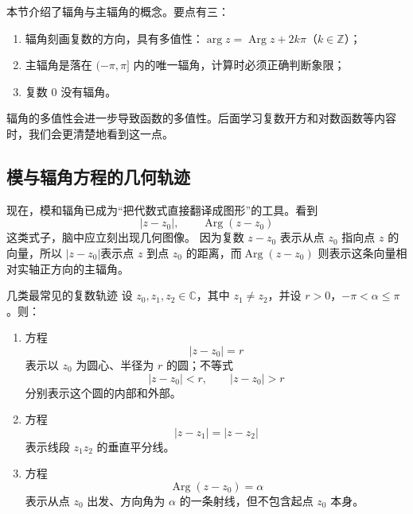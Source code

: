 \begin{zhu}{}{}
本节介绍了辐角与主辐角的概念。要点有三：
\begin{enumerate}
    \item 辐角刻画复数的方向，具有多值性：$\arg z = \operatorname{Arg}z + 2k\pi$（$k\in\mathbb{Z}$）；
    \item 主辐角是落在 $(-\pi,\pi]$ 内的唯一辐角，计算时必须正确判断象限；
    \item 复数 $0$ 没有辐角。
\end{enumerate}
\end{zhu}

\begin{tishi}[辐角多值性与函数的多值性]
辐角的多值性会进一步导致函数的多值性。后面学习复数开方和对数函数等内容时，我们会更清楚地看到这一点。
\end{tishi}

\subsection{模与辐角方程的几何轨迹}

现在，模和辐角已成为``把代数式直接翻译成图形''的工具。看到
\[
|z-z_0|,\qquad \operatorname{Arg}(z-z_0)
\]
这类式子，脑中应立刻出现几何图像。
因为复数 $z-z_0$ 表示从点 $z_0$ 指向点 $z$ 的向量，所以
$|z-z_0|$表示点 $z$ 到点 $z_0$ 的距离，而$\operatorname{Arg}(z-z_0)$
则表示这条向量相对实轴正方向的主辐角。

\begin{dingli}{几类最常见的复数轨迹}{}
设 $z_0,z_1,z_2\in\mathbb{C}$，其中 $z_1\neq z_2$，并设 $r>0$，$-\pi<\alpha\le \pi$。则：
\begin{enumerate}
    \item 方程
    \[
    |z-z_0|=r
    \]
    表示以 $z_0$ 为圆心、半径为 $r$ 的圆；不等式
    \[
    |z-z_0|<r,\qquad |z-z_0|>r
    \]
    分别表示这个圆的内部和外部。

    \item 方程
    \[
    |z-z_1|=|z-z_2|
    \]
    表示线段 $z_1z_2$ 的垂直平分线。

    \item 方程
    \[
    \operatorname{Arg}(z-z_0)=\alpha
    \]
    表示从点 $z_0$ 出发、方向角为 $\alpha$ 的一条射线，但不包含起点 $z_0$ 本身。
\end{enumerate}
\end{dingli}

